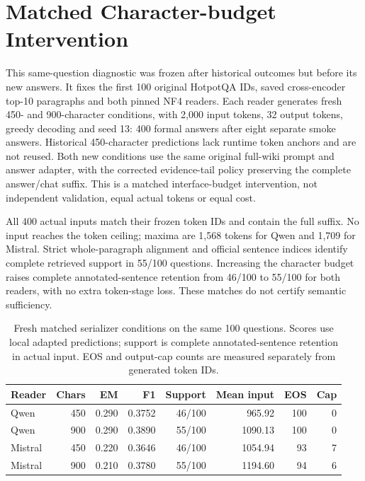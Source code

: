 \section{Matched Character-budget Intervention}
\label{sec:supp_followup_serializer}

This same-question diagnostic was frozen after historical outcomes but before its new answers. It fixes the first 100 original HotpotQA IDs, saved cross-encoder top-10 paragraphs and both pinned NF4 readers. Each reader generates fresh 450- and 900-character conditions, with 2,000 input tokens, 32 output tokens, greedy decoding and seed 13: 400 formal answers after eight separate smoke answers. Historical 450-character predictions lack runtime token anchors and are not reused. Both new conditions use the same original full-wiki prompt and answer adapter, with the corrected evidence-tail policy preserving the complete answer/chat suffix. This is a matched interface-budget intervention, not independent validation, equal actual tokens or equal cost.

All 400 actual inputs match their frozen token IDs and contain the full suffix. No input reaches the token ceiling; maxima are 1,568 tokens for Qwen and 1,709 for Mistral. Strict whole-paragraph alignment and official sentence indices identify complete retrieved support in 55/100 questions. Increasing the character budget raises complete annotated-sentence retention from 46/100 to 55/100 for both readers, with no extra token-stage loss. These matches do not certify semantic sufficiency.

\begin{table}[htbp]
\centering\footnotesize
\caption{Fresh matched serializer conditions on the same 100 questions. Scores use local adapted predictions; support is complete annotated-sentence retention in actual input. EOS and output-cap counts are measured separately from generated token IDs.}
\label{tab:followup_serializer_summary}
\begin{tabularx}{\textwidth}{l r r r r r r r}
\toprule
Reader & Chars & EM & F1 & Support & Mean input & EOS & Cap \\
\midrule
Qwen & 450 & 0.290 & 0.3752 & 46/100 & 965.92 & 100 & 0 \\
Qwen & 900 & 0.290 & 0.3890 & 55/100 & 1090.13 & 100 & 0 \\
Mistral & 450 & 0.220 & 0.3646 & 46/100 & 1054.94 & 93 & 7 \\
Mistral & 900 & 0.210 & 0.3780 & 55/100 & 1194.60 & 94 & 6 \\
\bottomrule
\end{tabularx}
\end{table}

